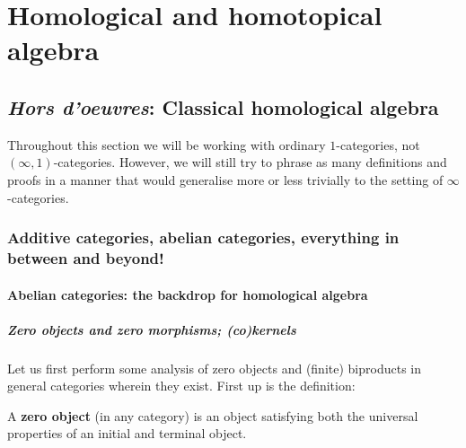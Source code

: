 \chapter{Homological and homotopical algebra}
    \begin{abstract}
        
    \end{abstract}
    
    \minitoc
    
    \section{\textit{Hors d'oeuvres}: Classical homological algebra}
        \begin{convention}
            Throughout this section we will be working with ordinary $1$-categories, not $(\infty, 1)$-categories. However, we will still try to phrase as many definitions and proofs in a manner that would generalise more or less trivially to the setting of $\infty$-categories.
        \end{convention}
    
        \subsection{Additive categories, abelian categories, everything in between and beyond!}
            \subsubsection{Abelian categories: the backdrop for homological algebra}
                \paragraph{Zero objects and zero morphisms; (co)kernels}
                    Let us first perform some analysis of zero objects and (finite) biproducts in general categories wherein they exist. First up is the definition:
                    \begin{definition} \label{def: zero_objects}
                        A \textbf{zero object} (in any category) is an object satisfying both the universal properties of an initial and terminal object.
                    \end{definition}
                    
                    
